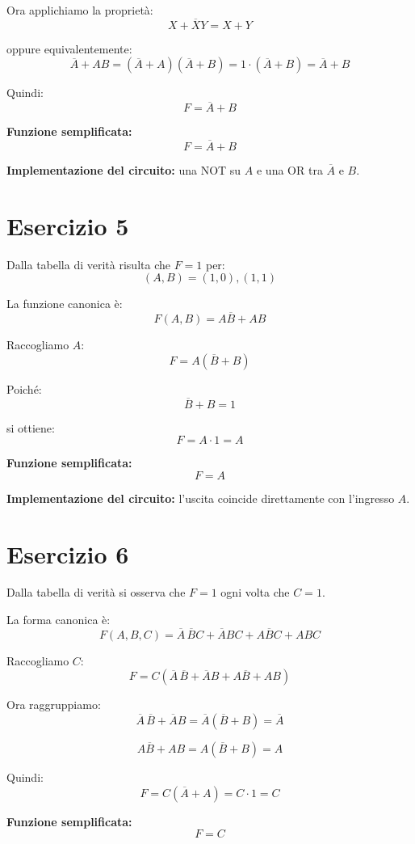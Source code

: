 \documentclass[a4paper,12pt]{article}
\begin{document}
	Ora applichiamo la proprietà:
	\[
	X+\overline{X}Y = X+Y
	\]
	
	oppure equivalentemente:
	\[
	\overline{A}+AB=(\overline{A}+A)(\overline{A}+B)=1\cdot(\overline{A}+B)=\overline{A}+B
	\]
	
	Quindi:
	\[
	F=\overline{A}+B
	\]
	
	\textbf{Funzione semplificata:}
	\[
	\boxed{F=\overline{A}+B}
	\]
	
	\textbf{Implementazione del circuito:} una NOT su $A$ e una OR tra $\overline{A}$ e $B$.
	
	\bigskip
	
	\section*{Esercizio 5}
	
	Dalla tabella di verità risulta che $F=1$ per:
	\[
	(A,B)=(1,0),(1,1)
	\]
	
	La funzione canonica è:
	\[
	F(A,B)=A\overline{B}+AB
	\]
	
	Raccogliamo $A$:
	\[
	F=A(\overline{B}+B)
	\]
	
	Poiché:
	\[
	\overline{B}+B=1
	\]
	
	si ottiene:
	\[
	F=A\cdot 1=A
	\]
	
	\textbf{Funzione semplificata:}
	\[
	\boxed{F=A}
	\]
	
	\textbf{Implementazione del circuito:} l'uscita coincide direttamente con l'ingresso $A$.
	
	\bigskip
	
	\section*{Esercizio 6}
	
	Dalla tabella di verità si osserva che $F=1$ ogni volta che $C=1$.
	
	La forma canonica è:
	\[
	F(A,B,C)=\overline{A}\,\overline{B}C+\overline{A}BC+A\overline{B}C+ABC
	\]
	
	Raccogliamo $C$:
	\[
	F=C(\overline{A}\,\overline{B}+\overline{A}B+A\overline{B}+AB)
	\]
	
	Ora raggruppiamo:
	\[
	\overline{A}\,\overline{B}+\overline{A}B=\overline{A}(\overline{B}+B)=\overline{A}
	\]
	
	\[
	A\overline{B}+AB=A(\overline{B}+B)=A
	\]
	
	Quindi:
	\[
	F=C(\overline{A}+A)=C\cdot 1=C
	\]
	
	\textbf{Funzione semplificata:}
	\[
	\boxed{F=C}
	\]
	
\end{document}
